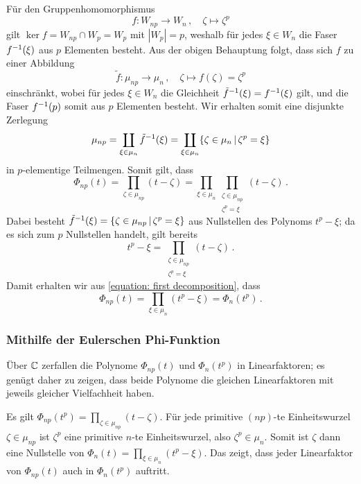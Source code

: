 Für den Gruppenhomomorphismus
\[
          f
  \colon  W_{np}
  \to     W_n\,,
  \quad   \zeta
  \mapsto \zeta^p
\]
gilt $\ker f = W_{np} \cap W_p = W_p$ mit $|W_p| = p$, weshalb für jedes $\xi \in W_n$ die Faser $f^{-1}(\xi)$ aus $p$ Elementen besteht.
Aus der obigen Behauptung folgt, dass sich $f$ zu einer Abbildung
\[
          \tilde{f}
  \colon  \mu_{np}
  \to     \mu_n\,,
  \quad   \zeta
  \mapsto f(\zeta)
  =       \zeta^p
\]
einschränkt, wobei für jedes $\xi \in W_n$ die Gleichheit $\tilde{f}^{-1}(\xi) = f^{-1}(\xi)$ gilt, und die Faser $f^{-1}(p)$ somit aus $p$ Elementen besteht.
Wir erhalten somit eine disjunkte Zerlegung
\[
    \mu_{np}
    = \coprod_{\xi \in \mu_n} \preim{\tilde{f}}{\xi}
    = \coprod_{\xi \in \mu_n} \{ \zeta \in \mu_n \suchthat \zeta^p = \xi \}
\]
in $p$-elementige Teilmengen.
Somit gilt, dass
\begin{equation}
  \label{equation: first decomposition}
    \Phi_{np}(t)
  = \prod_{\zeta \in \mu_{np}} (t - \zeta)
  = \prod_{\xi \in \mu_n} \prod_{\substack{\zeta \in \mu_{np} \\ \zeta^p = \xi}} (t - \zeta)\,.
\end{equation}
Dabei besteht $\preim{\tilde{f}}{\xi} = \{ \zeta \in \mu_{np} \suchthat \zeta^p = \xi \}$ aus Nullstellen des Polynoms $t^p - \xi$;
da es sich zum $p$ Nullstellen handelt, gilt bereits
\[
    t^p - \xi
  = \prod_{\substack{\zeta \in \mu_{np} \\ \zeta^p = \xi}} (t - \zeta)\,.
\]
Damit erhalten wir aus \eqref{equation: first decomposition}, dass
\[
    \Phi_{np}(t)
  = \prod_{\xi \in \mu_n} (t^p - \xi)
  = \Phi_n(t^p)\,.
\]



\subsubsection*{Mithilfe der Eulerschen Phi-Funktion}

Über $\mathbb{C}$ zerfallen die Polynome $\Phi_{np}(t)$ und $\Phi_n(t^p)$ in Linearfaktoren;
es genügt daher zu zeigen, dass beide Polynome die gleichen Linearfaktoren mit jeweils gleicher Vielfachheit haben.

Es gilt $\Phi_{np}(t^p) = \prod_{\zeta \in \mu_{np}} (t - \zeta)$.
Für jede primitive $(np)$-te Einheitswurzel $\zeta \in \mu_{np}$ ist $\zeta^p$ eine primitive $n$-te Einheitswurzel, also $\zeta^p \in \mu_n$.
Somit ist $\zeta$ dann eine Nullstelle von $\Phi_n(t) = \prod_{\xi \in \mu_n} (t^p - \xi)$.
Das zeigt, dass jeder Linearfaktor von $\Phi_{np}(t)$ auch in $\Phi_n(t^p)$ auftritt.


